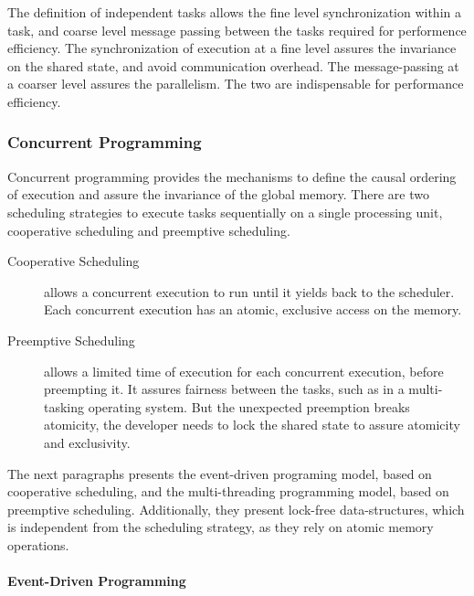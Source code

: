 The definition of independent tasks allows the fine level synchronization within a task, and coarse level message passing between the tasks required for performence efficiency.
The synchronization of execution at a fine level assures the invariance on the shared state, and avoid communication overhead.
The message-passing at a coarser level assures the parallelism.
The two are indispensable for performance efficiency.

\subsubsection{Concurrent Programming} \label{chapter3:software-maintainability:concurrency:concurrent-programming}


Concurrent programming provides the mechanisms to define the causal ordering of execution and assure the invariance of the global memory.
There are two scheduling strategies to execute tasks sequentially on a single processing unit, cooperative scheduling and preemptive scheduling.

\begin{description}
\item[Cooperative Scheduling] allows a concurrent execution to run until it yields back to the scheduler.
Each concurrent execution has an atomic, exclusive access on the memory.
\item[Preemptive Scheduling] allows a limited time of execution for each concurrent execution, before preempting it.
It assures fairness between the tasks, such as in a multi-tasking operating system.
But the unexpected preemption breaks atomicity, the developer needs to lock the shared state to assure atomicity and exclusivity.
\end{description}

The next paragraphs presents the event-driven programing model, based on cooperative scheduling, and the multi-threading programming model, based on preemptive scheduling.
Additionally, they present lock-free data-structures, which is independent from the scheduling strategy, as they rely on atomic memory operations.

\paragraph{Event-Driven Programming}

